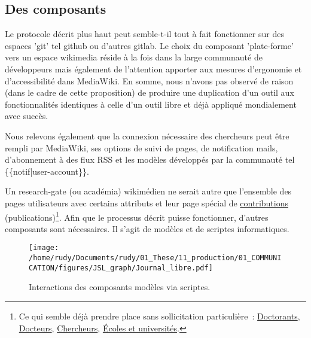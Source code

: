 \subsection{Des composants}
Le protocole décrit plus haut peut semble-t-il tout à fait fonctionner sur des espaces 'git' tel github ou d'autres gitlab.
Le choix du composant 'plate-forme' vers un espace wikimedia réside à la fois dans la large communauté de développeurs mais également de l'attention apporter aux mesures d'ergonomie et d'accessibilité dans MediaWiki.
En somme, nous n'avons pas observé de raison (dans le cadre de cette proposition) de produire une duplication d'un outil aux fonctionnalités identiques à celle d'un outil libre et déjà appliqué mondialement avec succès.

Nous relevons également que la connexion nécessaire des chercheurs peut être rempli par MediaWiki, ses options de suivi de pages, de notification mails, d'abonnement à des flux RSS et les modèles développés par la communauté tel \{\{notif|user-account\}\}.

Un research-gate (ou académia) wikimédien ne serait autre que l'ensemble des pages utilisateurs avec certains attributs et leur page spécial de \href{https://fr.wikipedia.org/w/index.php?title=Spécial:Contributions/Amélie_Pataud&offset=&limit=500&target=Amélie+Pataud}{contributions} (publications)\footnote{Ce qui semble déjà prendre place sans sollicitation particulière~:
\href{https://fr.wikipedia.org/wiki/Catégorie:Utilisateur_Doctorant}{Doctorants},
\href{https://fr.wikipedia.org/wiki/Catégorie:Utilisateur_Docteur}{Docteurs},
\href{https://fr.wikipedia.org/wiki/Catégorie:Utilisateur_Chercheur}{Chercheurs},
\href{https://fr.wikipedia.org/wiki/Catégorie:Wikipédiens_par_école_ou_université}{Écoles et universités}.
}.
Afin que le processus décrit puisse fonctionner, d'autres composants sont nécessaires.
Il s'agit de modèles et de scriptes informatiques.

\begin{figure}[htbp]
\centering
\texttt{[image: /home/rudy/Documents/rudy/01\_These/11\_production/01\_COMMUNICATION/figures/JSL\_graph/Journal\_libre.pdf]}
\caption{Interactions des composants modèles via scriptes.}
\label{fig:composant_JSL}
\end{figure}

